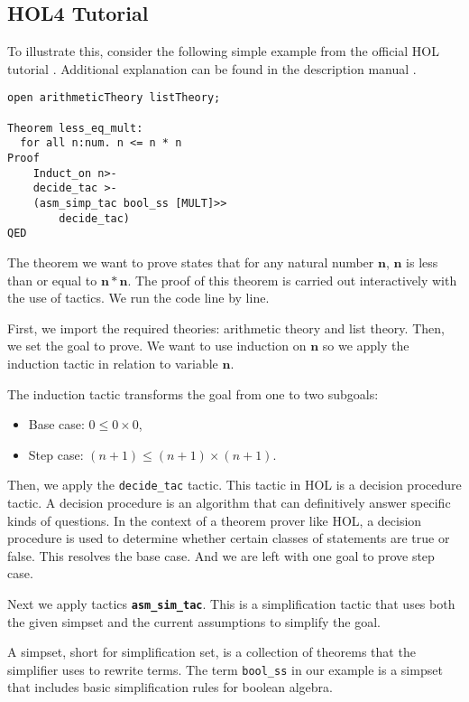 \subsection{HOL4 Tutorial}
To illustrate this, consider the following simple example from the official HOL tutorial \cite{HOL4interaction}. Additional explanation can be found in the description manual \cite{hol4manual}.
\begin{verbatim}
open arithmeticTheory listTheory;

Theorem less_eq_mult:
  for all n:num. n <= n * n
Proof
    Induct_on n>-
    decide_tac >-
    (asm_simp_tac bool_ss [MULT]>>
        decide_tac)
QED
\end{verbatim}

The theorem we want to prove states that for any natural number $\mathbf{n}$, $\mathbf{n}$ is less than or equal to $\mathbf{n} * \mathbf{n}$. The proof of this theorem is carried out interactively with the use of tactics. We run the code line by line. 

First, we import the required theories: arithmetic theory and list theory. Then, we set the goal to prove. We want to use induction on $\mathbf{n}$ so we apply the induction tactic in relation to variable $\mathbf{n}$.

The induction tactic transforms the goal from one to two subgoals:

\begin{itemize}
    \item Base case:  $0 \leq 0 \times 0$,
    \item Step case: $(n+1) \leq (n+1) \times (n+1)$.
\end{itemize}

Then, we apply the \texttt{decide\_tac} tactic. 
This tactic in HOL is a decision procedure tactic. A decision procedure is an algorithm that can definitively answer specific kinds of questions. In the context of a theorem prover like HOL, a decision procedure is used to determine whether certain classes of statements are true or false.
This resolves the base case. And we are left with one goal to prove step case. 

Next we apply tactics \textbf{\texttt{asm\_sim\_tac}}. This is a simplification tactic that uses both the given simpset and the current assumptions to simplify the goal.

A simpset, short for simplification set, is a collection of theorems that the simplifier uses to rewrite terms. The term \texttt{bool\_ss} in our example is a simpset that includes basic simplification rules for boolean algebra.

